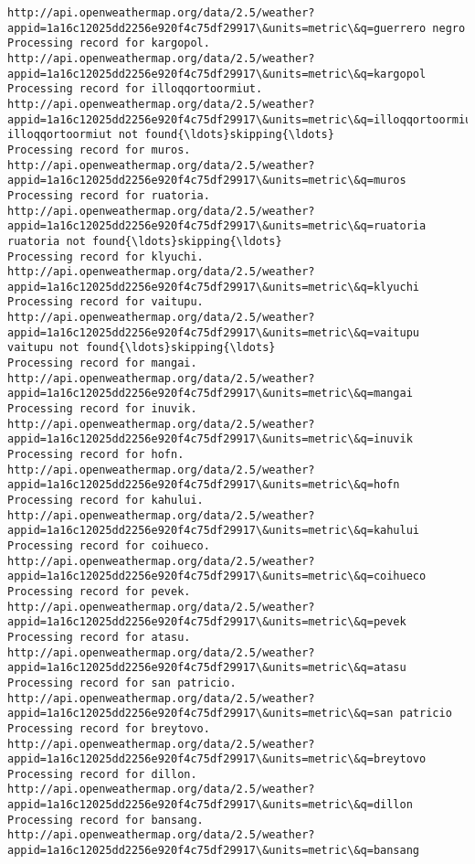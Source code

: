 \documentclass[11pt]{article}
\begin{document}
\begin{Verbatim}[commandchars=\\\{\}]
http://api.openweathermap.org/data/2.5/weather?appid=1a16c12025dd2256e920f4c75df29917\&units=metric\&q=guerrero negro
Processing record for kargopol.
http://api.openweathermap.org/data/2.5/weather?appid=1a16c12025dd2256e920f4c75df29917\&units=metric\&q=kargopol
Processing record for illoqqortoormiut.
http://api.openweathermap.org/data/2.5/weather?appid=1a16c12025dd2256e920f4c75df29917\&units=metric\&q=illoqqortoormiut
illoqqortoormiut not found{\ldots}skipping{\ldots}
Processing record for muros.
http://api.openweathermap.org/data/2.5/weather?appid=1a16c12025dd2256e920f4c75df29917\&units=metric\&q=muros
Processing record for ruatoria.
http://api.openweathermap.org/data/2.5/weather?appid=1a16c12025dd2256e920f4c75df29917\&units=metric\&q=ruatoria
ruatoria not found{\ldots}skipping{\ldots}
Processing record for klyuchi.
http://api.openweathermap.org/data/2.5/weather?appid=1a16c12025dd2256e920f4c75df29917\&units=metric\&q=klyuchi
Processing record for vaitupu.
http://api.openweathermap.org/data/2.5/weather?appid=1a16c12025dd2256e920f4c75df29917\&units=metric\&q=vaitupu
vaitupu not found{\ldots}skipping{\ldots}
Processing record for mangai.
http://api.openweathermap.org/data/2.5/weather?appid=1a16c12025dd2256e920f4c75df29917\&units=metric\&q=mangai
Processing record for inuvik.
http://api.openweathermap.org/data/2.5/weather?appid=1a16c12025dd2256e920f4c75df29917\&units=metric\&q=inuvik
Processing record for hofn.
http://api.openweathermap.org/data/2.5/weather?appid=1a16c12025dd2256e920f4c75df29917\&units=metric\&q=hofn
Processing record for kahului.
http://api.openweathermap.org/data/2.5/weather?appid=1a16c12025dd2256e920f4c75df29917\&units=metric\&q=kahului
Processing record for coihueco.
http://api.openweathermap.org/data/2.5/weather?appid=1a16c12025dd2256e920f4c75df29917\&units=metric\&q=coihueco
Processing record for pevek.
http://api.openweathermap.org/data/2.5/weather?appid=1a16c12025dd2256e920f4c75df29917\&units=metric\&q=pevek
Processing record for atasu.
http://api.openweathermap.org/data/2.5/weather?appid=1a16c12025dd2256e920f4c75df29917\&units=metric\&q=atasu
Processing record for san patricio.
http://api.openweathermap.org/data/2.5/weather?appid=1a16c12025dd2256e920f4c75df29917\&units=metric\&q=san patricio
Processing record for breytovo.
http://api.openweathermap.org/data/2.5/weather?appid=1a16c12025dd2256e920f4c75df29917\&units=metric\&q=breytovo
Processing record for dillon.
http://api.openweathermap.org/data/2.5/weather?appid=1a16c12025dd2256e920f4c75df29917\&units=metric\&q=dillon
Processing record for bansang.
http://api.openweathermap.org/data/2.5/weather?appid=1a16c12025dd2256e920f4c75df29917\&units=metric\&q=bansang

\end{Verbatim}
\end{document}
